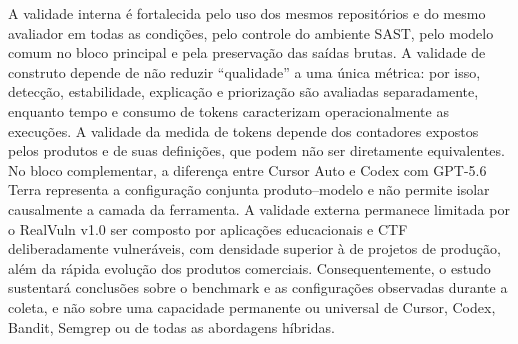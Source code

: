 A validade interna é fortalecida pelo uso dos mesmos repositórios e do mesmo avaliador em todas as condições, pelo controle do ambiente SAST, pelo modelo comum no bloco principal e pela preservação das saídas brutas. A validade de construto depende de não reduzir ``qualidade'' a uma única métrica: por isso, detecção, estabilidade, explicação e priorização são avaliadas separadamente, enquanto tempo e consumo de tokens caracterizam operacionalmente as execuções. A validade da medida de tokens depende dos contadores expostos pelos produtos e de suas definições, que podem não ser diretamente equivalentes. No bloco complementar, a diferença entre Cursor Auto e Codex com GPT-5.6 Terra representa a configuração conjunta produto--modelo e não permite isolar causalmente a camada da ferramenta. A validade externa permanece limitada por o RealVuln v1.0 ser composto por aplicações educacionais e CTF deliberadamente vulneráveis, com densidade superior à de projetos de produção, além da rápida evolução dos produtos comerciais. Consequentemente, o estudo sustentará conclusões sobre o benchmark e as configurações observadas durante a coleta, e não sobre uma capacidade permanente ou universal de Cursor, Codex, Bandit, Semgrep ou de todas as abordagens híbridas.
